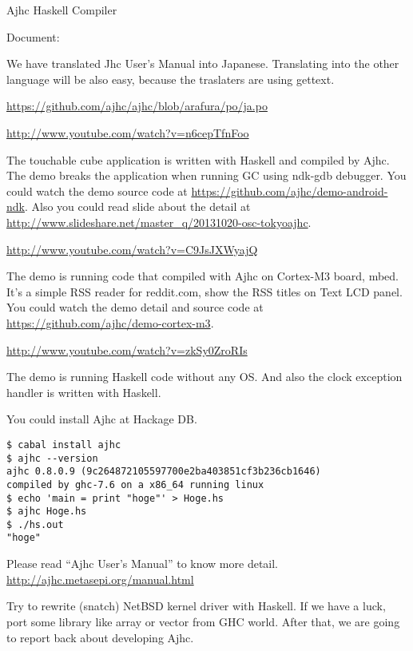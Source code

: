 \documentclass[DIV16,twocolumn,10pt]{scrreprt}
\begin{document}
\begin{hcarentry}{Ajhc Haskell Compiler}
\vspace*{10pt}

\noindent Document:

We have translated Jhc User's Manual into Japanese.
Translating into the other language will be also easy, because the traslaters are using gettext.

\noindent \url{https://github.com/ajhc/ajhc/blob/arafura/po/ja.po}

\Demo

\noindent \url{http://www.youtube.com/watch?v=n6cepTfnFoo}

The touchable cube application is written with Haskell and compiled by Ajhc. The demo breaks the application when running GC using ndk-gdb debugger. You could watch the demo source code at \url{https://github.com/ajhc/demo-android-ndk}. Also you could read slide about the detail at \url{http://www.slideshare.net/master\_q/20131020-osc-tokyoajhc}.

\vspace*{10pt}

\noindent \url{http://www.youtube.com/watch?v=C9JsJXWyajQ}

The demo is running code that compiled with Ajhc on Cortex-M3 board, mbed. It's a simple RSS reader for reddit.com, show the RSS titles on Text LCD panel. You could watch the demo detail and source code at \url{https://github.com/ajhc/demo-cortex-m3}.

\vspace*{10pt}

\noindent \url{http://www.youtube.com/watch?v=zkSy0ZroRIs}

The demo is running Haskell code without any OS.
And also the clock exception handler is written with Haskell.

\Usage

You could install Ajhc at Hackage DB.

\begin{verbatim}
$ cabal install ajhc
$ ajhc --version
ajhc 0.8.0.9 (9c264872105597700e2ba403851cf3b236cb1646)
compiled by ghc-7.6 on a x86_64 running linux
$ echo 'main = print "hoge"' > Hoge.hs
$ ajhc Hoge.hs
$ ./hs.out
"hoge"
\end{verbatim}

Please read ``Ajhc User's Manual'' to know more detail. \url{http://ajhc.metasepi.org/manual.html}

\FuturePlans

Try to rewrite (snatch) NetBSD kernel driver with Haskell. If we have a luck, port some library like array or vector from GHC world. After that, we are going to report back about developing Ajhc.


\end{hcarentry}
\end{document}
